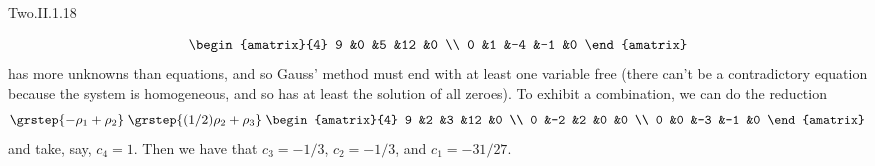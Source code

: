 \begin{ans}{Two.II.1.18}
\begin{exparts}
\begin{equation*}
\begin{amatrix}{4}
              9  &0  &5  &12  &0  \\
              0  &1  &-4 &-1  &0
            \end{amatrix}
          \end{equation*}
          has more unknowns than equations, and so Gauss' method
          must end with at least one variable free (there can't be a
          contradictory equation because the system is homogeneous, and so
          has at least the solution of all zeroes).
          To exhibit a combination, we can do the reduction
          \begin{equation*}
            \grstep{-\rho_1+\rho_2}
            \;\grstep{(1/2)\rho_2+\rho_3}\;
            \begin{amatrix}{4}
              9  &2  &3  &12  &0  \\
              0  &-2 &2  &0   &0  \\
              0  &0  &-3 &-1  &0
            \end{amatrix}
          \end{equation*}
          and take, say,  $c_4=1$.
          Then we have that $c_3=-1/3$, $c_2=-1/3$, and $c_1=-31/27$.
      \end{exparts}
    
\end{ans}
